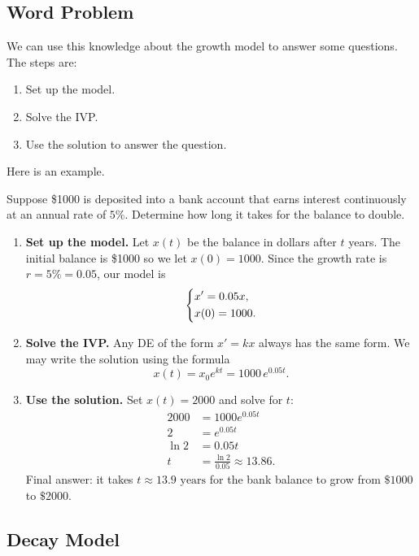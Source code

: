 \documentclass[09pt,letterpaper]{article}
\begin{document}
\subsection{Word Problem}
We can use this knowledge about the growth model to answer some questions. The steps are:
\begin{enumerate}
    \item Set up the model. 
    \item Solve the IVP. 
    \item Use the solution to answer the question.
\end{enumerate}
Here is an example.

\begin{example}[3]{
Suppose \$1000 is deposited into a bank account that earns interest continuously at an annual rate of $5\%$. Determine how long it takes for the balance to double.
}

\begin{enumerate}
\item \textbf{Set up the model.} Let $x(t)$ be the balance in dollars after $t$ years. The initial balance is \$1000 so we let $x(0)=1000$. Since the growth rate is $r=5\% = 0.05$, our model is
\[
\begin{dcases}
x' = 0.05x,\\
x(0)= 1000.
\end{dcases}
\]
\item \textbf{Solve the IVP.} Any DE of the form $x'=kx$ always has the same form. We may write the solution using the formula
\[
x(t) = x_0 e^{kt} =1000\,e^{0.05t}.
\]
\item \textbf{Use the solution.} Set $x(t)=2000$ and solve for $t$:
\begin{align*}
2000 &= 1000 e^{0.05t} \\
2 &= e^{0.05t} \\
\ln 2 &= 0.05t \\
t &= \frac{\ln 2}{0.05} \approx 13.86.
\end{align*}
Final answer: it takes $\boxed{t \approx 13.9 \text{ years}}$ for the bank balance to grow from $\$1000$ to $\$2000$.
\end{enumerate}
\end{example}


\subsection{Decay Model}
\end{document}
